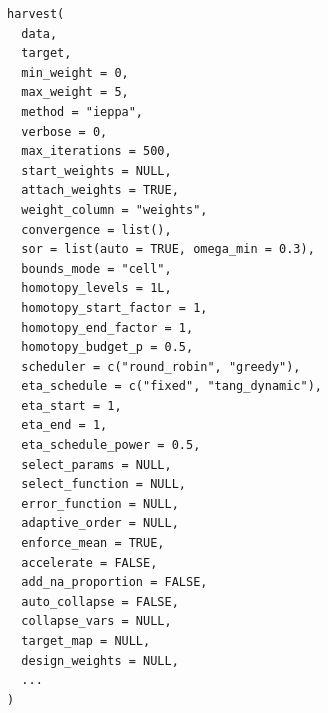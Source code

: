 \documentclass[a4paper]{book}
\begin{document}
\begin{Usage}
\begin{verbatim}
harvest(
  data,
  target,
  min_weight = 0,
  max_weight = 5,
  method = "ieppa",
  verbose = 0,
  max_iterations = 500,
  start_weights = NULL,
  attach_weights = TRUE,
  weight_column = "weights",
  convergence = list(),
  sor = list(auto = TRUE, omega_min = 0.3),
  bounds_mode = "cell",
  homotopy_levels = 1L,
  homotopy_start_factor = 1,
  homotopy_end_factor = 1,
  homotopy_budget_p = 0.5,
  scheduler = c("round_robin", "greedy"),
  eta_schedule = c("fixed", "tang_dynamic"),
  eta_start = 1,
  eta_end = 1,
  eta_schedule_power = 0.5,
  select_params = NULL,
  select_function = NULL,
  error_function = NULL,
  adaptive_order = NULL,
  enforce_mean = TRUE,
  accelerate = FALSE,
  add_na_proportion = FALSE,
  auto_collapse = FALSE,
  collapse_vars = NULL,
  target_map = NULL,
  design_weights = NULL,
  ...
)
\end{verbatim}
\end{Usage}
%
\end{document}
